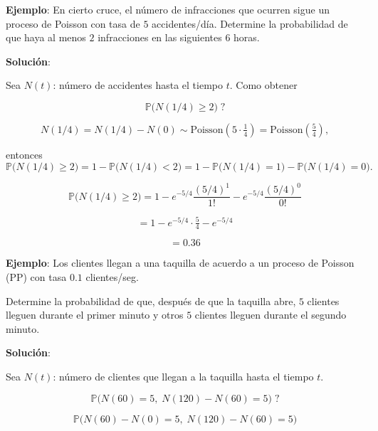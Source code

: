 \documentclass[12pt]{article}
\begin{document}
\textbf{Ejemplo}: En cierto cruce, el número de infracciones que ocurren sigue un proceso de Poisson con tasa de $5$ accidentes/día.  
Determine la probabilidad de que haya al menos $2$ infracciones en las siguientes $6$ horas.

\textbf{Solución}:

Sea $N(t)$: número de accidentes hasta el tiempo $t$. Como obtener

\begin{equation*}
\mathbb{P}\big(N(1/4) \geq 2\big)\; ?
\end{equation*}


\begin{equation*}
N(1/4) = N(1/4) - N(0) \sim \text{Poisson}\!\left( 5 \cdot \tfrac{1}{4} \right) 
= \text{Poisson}\!\left(\tfrac{5}{4}\right),
\end{equation*}

entonces
\begin{equation*}
\mathbb{P}\big(N(1/4) \geq 2\big) 
= 1 - \mathbb{P}\big(N(1/4) < 2\big)
= 1 - \mathbb{P}\big(N(1/4) = 1\big) - \mathbb{P}\big(N(1/4) = 0\big).
\end{equation*}

\begin{equation*}
\mathbb{P}\big(N(1/4) \geq 2\big) 
= 1 - e^{-5/4}\frac{(5/4)^1}{1!} - e^{-5/4}\frac{(5/4)^0}{0!}
\end{equation*}

\begin{equation*}
= 1 - e^{-5/4}\cdot \tfrac{5}{4} - e^{-5/4}
\end{equation*}

\begin{equation*}
= 0.36
\end{equation*}

\textbf{Ejemplo}: Los clientes llegan a una taquilla de acuerdo a un proceso de Poisson (PP) con tasa $0.1$ clientes/seg.  

Determine la probabilidad de que, después de que la taquilla abre, $5$ clientes lleguen durante el primer minuto y otros $5$ clientes lleguen durante el segundo minuto.

\textbf{Solución}:

Sea $N(t)$: número de clientes que llegan a la taquilla hasta el tiempo $t$.

\begin{equation*}
\mathbb{P}\big(N(60) = 5,\; N(120) - N(60) = 5\big)\; ?
\end{equation*}

\begin{equation*}
\mathbb{P}\big(N(60) - N(0) = 5,\; N(120) - N(60) = 5\big)
\end{equation*}
\end{document}
